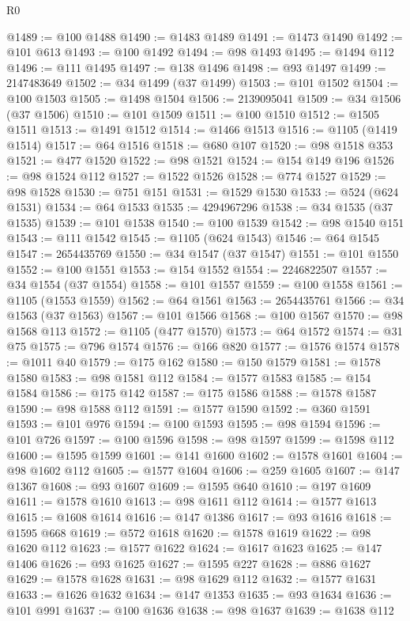 \begin{lexlean}{R0}
\begin{coremodule}
@1489 := @100 @1488
@1490 := @1483 @1489
@1491 := @1473 @1490
@1492 := @101 @613
@1493 := @100 @1492
@1494 := @98 @1493
@1495 := @1494 @112
@1496 := @111 @1495
@1497 := @138 @1496
@1498 := @93 @1497
@1499 := 2147483649
@1502 := @34 @1499 (@37 @1499)
@1503 := @101 @1502
@1504 := @100 @1503
@1505 := @1498 @1504
@1506 := 2139095041
@1509 := @34 @1506 (@37 @1506)
@1510 := @101 @1509
@1511 := @100 @1510
@1512 := @1505 @1511
@1513 := @1491 @1512
@1514 := @1466 @1513
@1516 := @1105 (@1419 @1514)
@1517 := @64 @1516
@1518 := @680 @107
@1520 := @98 @1518 @353
@1521 := @477 @1520
@1522 := @98 @1521
@1524 := @154 @149 @196
@1526 := @98 @1524 @112
@1527 := @1522 @1526
@1528 := @774 @1527
@1529 := @98 @1528
@1530 := @751 @151
@1531 := @1529 @1530
@1533 := @524 (@624 @1531)
@1534 := @64 @1533
@1535 := 4294967296
@1538 := @34 @1535 (@37 @1535)
@1539 := @101 @1538
@1540 := @100 @1539
@1542 := @98 @1540 @151
@1543 := @111 @1542
@1545 := @1105 (@624 @1543)
@1546 := @64 @1545
@1547 := 2654435769
@1550 := @34 @1547 (@37 @1547)
@1551 := @101 @1550
@1552 := @100 @1551
@1553 := @154 @1552
@1554 := 2246822507
@1557 := @34 @1554 (@37 @1554)
@1558 := @101 @1557
@1559 := @100 @1558
@1561 := @1105 (@1553 @1559)
@1562 := @64 @1561
@1563 := 2654435761
@1566 := @34 @1563 (@37 @1563)
@1567 := @101 @1566
@1568 := @100 @1567
@1570 := @98 @1568 @113
@1572 := @1105 (@477 @1570)
@1573 := @64 @1572
@1574 := @31 @75
@1575 := @796 @1574
@1576 := @166 @820
@1577 := @1576 @1574
@1578 := @1011 @40
@1579 := @175 @162
@1580 := @150 @1579
@1581 := @1578 @1580
@1583 := @98 @1581 @112
@1584 := @1577 @1583
@1585 := @154 @1584
@1586 := @175 @142
@1587 := @175 @1586
@1588 := @1578 @1587
@1590 := @98 @1588 @112
@1591 := @1577 @1590
@1592 := @360 @1591
@1593 := @101 @976
@1594 := @100 @1593
@1595 := @98 @1594
@1596 := @101 @726
@1597 := @100 @1596
@1598 := @98 @1597
@1599 := @1598 @112
@1600 := @1595 @1599
@1601 := @141 @1600
@1602 := @1578 @1601
@1604 := @98 @1602 @112
@1605 := @1577 @1604
@1606 := @259 @1605
@1607 := @147 @1367
@1608 := @93 @1607
@1609 := @1595 @640
@1610 := @197 @1609
@1611 := @1578 @1610
@1613 := @98 @1611 @112
@1614 := @1577 @1613
@1615 := @1608 @1614
@1616 := @147 @1386
@1617 := @93 @1616
@1618 := @1595 @668
@1619 := @572 @1618
@1620 := @1578 @1619
@1622 := @98 @1620 @112
@1623 := @1577 @1622
@1624 := @1617 @1623
@1625 := @147 @1406
@1626 := @93 @1625
@1627 := @1595 @227
@1628 := @886 @1627
@1629 := @1578 @1628
@1631 := @98 @1629 @112
@1632 := @1577 @1631
@1633 := @1626 @1632
@1634 := @147 @1353
@1635 := @93 @1634
@1636 := @101 @991
@1637 := @100 @1636
@1638 := @98 @1637
@1639 := @1638 @112

\end{coremodule}
\end{lexlean}
